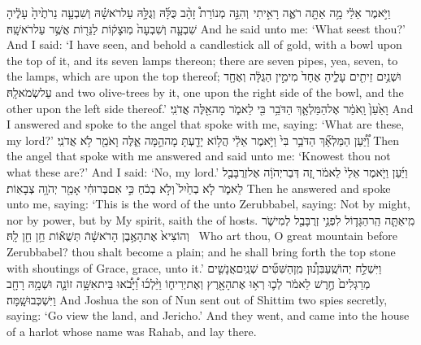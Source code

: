 {וַיֹּ֣אמֶר אֵלַ֔י מָ֥ה אַתָּ֖ה רֹאֶ֑ה  רָאִ֣יתִי \pasek  וְהִנֵּ֣ה מְנוֹרַת֩ זָהָ֨ב כֻּלָּ֜הּ וְגֻלָּ֣הּ עַל\maqqaf רֹאשָׁ֗הּ וְשִׁבְעָ֤ה נֵרֹתֶ֙יהָ֙ עָלֶ֔יהָ שִׁבְעָ֤ה וְשִׁבְעָה֙ מֽוּצָק֔וֹת לַנֵּר֖וֹת אֲשֶׁ֥ר עַל\maqqaf רֹאשָֽׁהּ׃}
{And he said unto me: ‘What seest thou?’ And I said: ‘I have seen, and behold a candlestick all of gold, with a bowl upon the top of it, and its seven lamps thereon; there are seven pipes, yea, seven, to the lamps, which are upon the top thereof;}
{וּשְׁנַ֥יִם זֵיתִ֖ים עָלֶ֑יהָ אֶחָד֙ מִימִ֣ין הַגֻּלָּ֔ה וְאֶחָ֖ד עַל\maqqaf שְׂמֹאלָֽהּ׃}
{and two olive-trees by it, one upon the right side of the bowl, and the other upon the left side thereof.’}
{וָאַ֙עַן֙ וָֽאֹמַ֔ר אֶל\maqqaf הַמַּלְאָ֛ךְ הַדֹּבֵ֥ר בִּ֖י לֵאמֹ֑ר מָה\maqqaf אֵ֖לֶּה אֲדֹנִֽי׃}
{And I answered and spoke to the angel that spoke with me, saying: ‘What are these, my lord?’}
{וַ֠יַּ֠עַן הַמַּלְאָ֞ךְ הַדֹּבֵ֥ר בִּי֙ וַיֹּ֣אמֶר אֵלַ֔י הֲל֥וֹא יָדַ֖עְתָּ מָה\maqqaf הֵ֣מָּה אֵ֑לֶּה וָאֹמַ֖ר לֹ֥א אֲדֹנִֽי׃}
{Then the angel that spoke with me answered and said unto me: ‘Knowest thou not what these are?’ And I said: ‘No, my lord.’}
{וַיַּ֜עַן וַיֹּ֤אמֶר אֵלַי֙ לֵאמֹ֔ר זֶ֚ה דְּבַר\maqqaf יְהֹוָ֔ה אֶל\maqqaf זְרֻבָּבֶ֖ל לֵאמֹ֑ר לֹ֤א בְחַ֙יִל֙ וְלֹ֣א בְכֹ֔חַ כִּ֣י אִם\maqqaf בְּרוּחִ֔י אָמַ֖ר יְהֹוָ֥ה צְבָאֽוֹת׃}
{Then he answered and spoke unto me, saying: ‘This is the word of the \lord\space unto Zerubbabel, saying: Not by might, nor by power, but by My spirit, saith the \lord\space of hosts.}
{מִֽי\maqqaf אַתָּ֧ה הַֽר\maqqaf הַגָּד֛וֹל לִפְנֵ֥י זְרֻבָּבֶ֖ל לְמִישֹׁ֑ר וְהוֹצִיא֙ אֶת\maqqaf הָאֶ֣בֶן הָרֹאשָׁ֔הֿ תְּשֻׁא֕וֹת חֵ֥ן חֵ֖ן לָֽהּ׃ \petucha }
{Who art thou, O great mountain before Zerubbabel? thou shalt become a plain; and he shall bring forth the top stone with shoutings of Grace, grace, unto it.’}
\newperek
{}
\label{haft_37}
\setcounter{chap}{2}
\setcounter{verse}{1}
{וַיִּשְׁלַ֣ח יְהוֹשֻֽׁעַ\maqqaf בִּן\maqqaf נ֠וּן מִֽן\maqqaf הַשִּׁטִּ֞ים שְׁנַֽיִם\maqqaf אֲנָשִׁ֤ים מְרַגְּלִים֙ חֶ֣רֶשׁ לֵאמֹ֔ר לְכ֛וּ רְא֥וּ אֶת\maqqaf הָאָ֖רֶץ וְאֶת\maqqaf יְרִיח֑וֹ וַיֵּ֨לְכ֜וּ וַ֠יָּבֹ֠אוּ בֵּית\maqqaf אִשָּׁ֥ה זוֹנָ֛ה וּשְׁמָ֥הּ רָחָ֖ב וַיִּשְׁכְּבוּ\maqqaf שָֽׁמָּה׃}
{And Joshua the son of Nun sent out of Shittim two spies secretly, saying: ‘Go view the land, and Jericho.’ And they went, and came into the house of a harlot whose name was Rahab, and lay there.}
